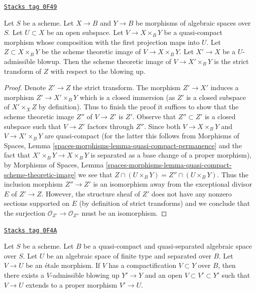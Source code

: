 \begin{lemma}
\label{spaces-pushouts-lemma-replaced-by-strict-transform}
\href{https://stacks.math.columbia.edu/tag/0F49}{\texttt{Stacks tag 0F49}}

Let $S$ be a scheme. Let $X \to B$ and $Y \to B$ be morphisms of
algebraic spaces over $S$. Let $U \subset X$ be an open subspace.
Let $V \to X \times_B Y$ be a quasi-compact morphism
whose composition with the first projection maps into $U$.
Let $Z \subset X \times_B Y$ be the scheme theoretic image of
$V \to X \times_B Y$. Let $X' \to X$ be a $U$-admissible blowup.
Then the scheme theoretic image of $V \to X' \times_B Y$ is the
strict transform of $Z$ with respect to the blowing up.
\end{lemma}

\begin{proof}
Denote $Z' \to Z$ the strict transform. The morphism $Z' \to X'$
induces a morphism $Z' \to X' \times_B Y$ which is a closed immersion
(as $Z'$ is a closed subspace of $X' \times_X Z$ by definition).
Thus to finish the proof it suffices to show that the scheme theoretic
image $Z''$ of $V \to Z'$ is $Z'$. Observe that $Z'' \subset Z'$
is a closed subspace such that $V \to Z'$ factors through $Z''$.
Since both $V \to X \times_B Y$ and $V \to X' \times_B Y$ are
quasi-compact (for the latter this follows from Morphisms of Spaces, Lemma
\ref{spaces-morphisms-lemma-quasi-compact-permanence}
and the fact that $X' \times_B Y \to X \times_B Y$ is separated
as a base change of a proper morphism), by Morphisms of Spaces, Lemma
\ref{spaces-morphisms-lemma-quasi-compact-scheme-theoretic-image}
we see that $Z \cap (U \times_B Y) = Z'' \cap (U \times_B Y)$.
Thus the inclusion morphism $Z'' \to Z'$ is an isomorphism
away from the exceptional divisor $E$ of $Z' \to Z$. However, the
structure sheaf of $Z'$ does not have any nonzero sections supported
on $E$ (by definition of strict transforms) and we conclude that
the surjection $\mathcal{O}_{Z'} \to \mathcal{O}_{Z''}$ must be an isomorphism.
\end{proof}

\begin{lemma}
\label{spaces-pushouts-lemma-compactification-dominates}
\href{https://stacks.math.columbia.edu/tag/0F4A}{\texttt{Stacks tag 0F4A}}

Let $S$ be a scheme. Let $B$ be a quasi-compact and quasi-separated
algebraic space over $S$. Let $U$ be an algebraic space
of finite type and separated over $B$. Let $V \to U$ be an \'etale morphism.
If $V$ has a compactification $V \subset Y$ over $B$, then there
exists a $V$-admissible blowing up $Y' \to Y$ and an
open $V \subset V' \subset Y'$ such that $V \to U$
extends to a proper morphism $V' \to U$.
\end{lemma}

